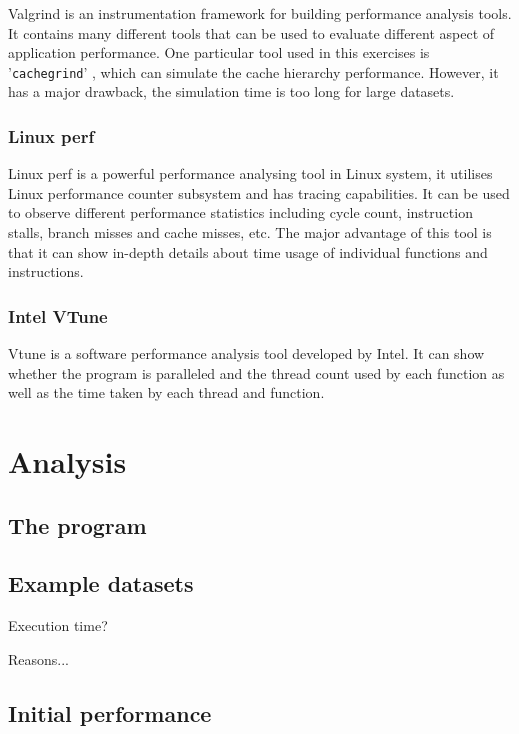 \documentclass[conference]{IEEEtran}
\begin{document}
Valgrind \cite{nethercote2003valgrind} is an instrumentation framework for building performance analysis tools. It contains many different tools that can be used to evaluate different aspect of application performance. One particular tool used in this exercises is '\texttt{cachegrind}' \cite{seward2004cachegrind}, which can simulate the cache hierarchy performance. However, it has a major drawback, the simulation time is too long for large datasets.

\subsubsection{Linux perf}

Linux perf \cite{de2010new} is a powerful performance analysing tool in Linux system, it utilises Linux performance counter subsystem and has tracing capabilities. It can be used to observe different performance statistics including cycle count, instruction stalls, branch misses and cache misses, etc. The major advantage of this tool is that it can show in-depth details about time usage of individual functions and instructions.

\subsubsection{Intel VTune}

Vtune \cite{malladi2009using} is a software performance analysis tool developed by Intel. It can show whether the program is paralleled and the thread count used by each function as well as the time taken by each thread and function.  

\section{Analysis}

\subsection{The program}

\subsection{Example datasets}

Execution time?

Reasons...

\subsection{Initial performance}
\end{document}
